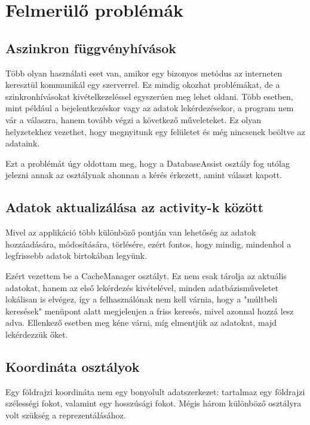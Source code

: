 \section{Felmerülő problémák}\label{sec:ALAP:adatelem}


\subsection{Aszinkron függvényhívások}\label{sec:ALAP:adatelem}

Több olyan használati eset van, amikor egy bizonyos metódus az interneten keresztül kommunikál egy szerverrel. Ez mindig okozhat problémákat, de a szinkronhívásokat kivételkezeléssel egyszerúen meg lehet oldani. Több esetben, mint például a bejelentkezéskor vagy az adatok lekérdezésekor, a program nem vár a válaszra, hanem tovább végzi a következő műveleteket. Ez olyan helyzetekhez vezethet, hogy megnyitunk egy felületet és még nincsenek beöltve az adataink. 

Ezt a problémát úgy oldottam meg, hogy a DatabaseAssist osztály fog utólag jelezni annak az osztálynak ahonnan a kérés érkezett, amint választ kapott.


\subsection{Adatok aktualizálása az activity-k között}\label{sec:ALAP:adatelem}

Mivel az applikáció több különböző pontján van lehetőség az adatok hozzáadására, módosítására, törlésére, ezért fontos, hogy mindig, mindenhol a legfrissebb adatok birtokában legyünk.

Ezért vezettem be a CacheManager osztályt. Ez nem csak tárolja az aktuális adatokat, hanem az első lekérdezés kivételével, minden adatbázisműveletet lokálisan is elvégez, így a felhasználónak nem kell várnia, hogy a "múltbeli keresések" menüpont alatt megjelenjen a friss keresés, mivel azonnal hozzá lesz adva. Ellenkező esetben meg kéne várni, míg elmentjük az adatokat, majd lekérdezzük őket.

\subsection{Koordináta osztályok}

Egy földrajzi koordináta nem egy bonyolult adatszerkezet: tartalmaz egy földrajzi szélességi fokot, valamint egy hosszúsági fokot. Mégis három különböző osztályra volt szükség a reprezentálásához. 

